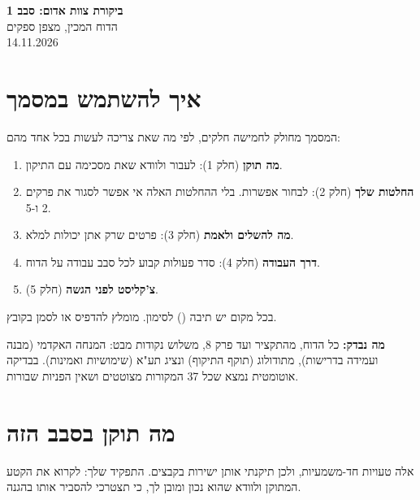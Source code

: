 \documentclass[11pt,a4paper]{article}
\newcommand{\cb}{\framebox[1.7ex]{\rule{0pt}{1.3ex}}}
\begin{document}
\begin{center}
{\LARGE \textbf{ביקורת צוות אדום: סבב 1}}\\[4pt]
{\large הדוח המכין, מצפן ספקים}\\[2pt]
14.11.2026
\end{center}

\section*{איך להשתמש במסמך}
המסמך מחולק לחמישה חלקים, לפי מה שאת צריכה לעשות בכל אחד מהם:
\begin{enumerate}
\item \textbf{מה תוקן} (חלק 1): לעבור ולוודא שאת מסכימה עם התיקון.
\item \textbf{החלטות שלך} (חלק 2): לבחור אפשרות. בלי ההחלטות האלה אי אפשר לסגור את פרקים 2 ו-5.
\item \textbf{מה להשלים ולאמת} (חלק 3): פרטים שרק אתן יכולות למלא.
\item \textbf{דרך העבודה} (חלק 4): סדר פעולות קבוע לכל סבב עבודה על הדוח.
\item \textbf{צ'קליסט לפני הגשה} (חלק 5).
\end{enumerate}
בכל מקום יש תיבה (\cb) לסימון. מומלץ להדפיס או לסמן בקובץ.

\textbf{מה נבדק:} כל הדוח, מהתקציר ועד פרק 8, משלוש נקודות מבט: המנחה האקדמי (מבנה ועמידה בדרישות), מתודולוג (תוקף התיקוף) ונציג תע"א (שימושיות ואמינות). בבדיקה אוטומטית נמצא שכל 37 המקורות מצוטטים ושאין הפניות שבורות.

\section{מה תוקן בסבב הזה}
אלה טעויות חד-משמעיות, ולכן תיקנתי אותן ישירות בקבצים. התפקיד שלך: לקרוא את הקטע המתוקן ולוודא שהוא נכון ומובן לך, כי תצטרכי להסביר אותו בהגנה.
\end{document}
